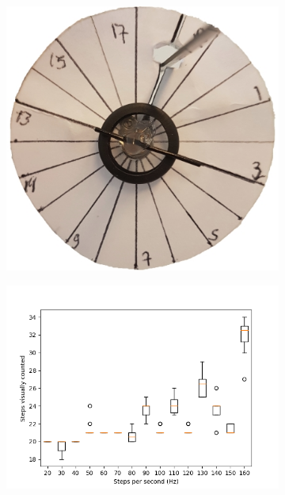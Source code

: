 \begin{figure}
	\centering
	\begin{subfigure}[b]{0.38\textwidth}
		\includegraphics[width=\textwidth]{pics/step_counting.jpg}
		\caption{}
		\label{fig:step_counting}
	\end{subfigure}
	\quad
	\begin{subfigure}[b]{0.55\textwidth}
		\includegraphics[width=\textwidth]{pics/figure_intertia.png}
		\caption{}
		\label{fig:step_results}
	\end{subfigure}
\end{figure}

